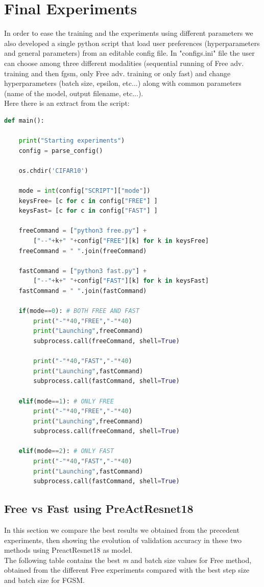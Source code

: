 \documentclass{article}
\begin{document}
\section{Final Experiments}
In order to ease the training and the experiments using different parameters we also developed a single python script that load user preferences (hyperparameters and general parameters) from an editable config file. In "configs.ini" file the user can choose among three different modalities (sequential running of Free adv. training and then fgsm, only Free adv. training or only fast) and change hyperparameters  (batch size, epsilon, etc...) along with common parameters (name of the model, output filename, etc...).\\
Here there is an extract from the script:

\begin{lstlisting}[language=Python, captionpos={b}, caption={main\_script.py}]
def main():
	
	print("Starting experiments")
	config = parse_config()
	
	os.chdir('CIFAR10')
	
	mode = int(config["SCRIPT"]["mode"])
	keysFree= [c for c in config["FREE"] ]
	keysFast= [c for c in config["FAST"] ]
	
	freeCommand = ["python3 free.py"] + 
		["--"+k+" "+config["FREE"][k] for k in keysFree]
	freeCommand = " ".join(freeCommand)
	
	fastCommand = ["python3 fast.py"] + 
		["--"+k+" "+config["FAST"][k] for k in keysFast]
	fastCommand = " ".join(fastCommand)
	
	if(mode==0): # BOTH FREE AND FAST
		print("-"*40,"FREE","-"*40)
		print("Launching",freeCommand)
		subprocess.call(freeCommand, shell=True)
	
		print("-"*40,"FAST","-"*40)
		print("Launching",fastCommand)
		subprocess.call(fastCommand, shell=True)
		
	elif(mode==1): # ONLY FREE
		print("-"*40,"FREE","-"*40)
		print("Launching",freeCommand)
		subprocess.call(freeCommand, shell=True)
	
	elif(mode==2): # ONLY FAST
		print("-"*40,"FAST","-"*40)
		print("Launching",fastCommand)
		subprocess.call(fastCommand, shell=True)	
\end{lstlisting}

\subsection{Free vs Fast using PreActResnet18}
In this section we compare the best results we obtained from the precedent experiments, then showing the evolution of validation accuracy in these two methods using PreactResnet18 as model. \\
The following table contains the best \textit{m} and batch size values for Free method, obtained from the different Free experiments compared with the best step size and batch size for FGSM.
\end{document}
